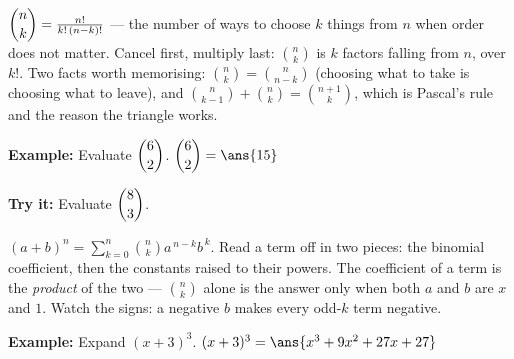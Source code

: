\documentclass[12pt]{article}
\begin{document}


\begin{formulabox}
$\dbinom{n}{k} = \frac{n!}{k!\,(n-k)!}$ --- the number of ways to choose $k$
things from $n$ when order does not matter. Cancel first, multiply last:
$\binom{n}{k}$ is $k$ factors falling from $n$, over $k!$. Two facts worth
memorising: $\binom{n}{k} = \binom{n}{n-k}$ (choosing what to take is choosing
what to leave), and $\binom{n}{k-1} + \binom{n}{k} = \binom{n+1}{k}$, which is
Pascal's rule and the reason the triangle works.
\end{formulabox}

\begin{examplebox}
\textbf{Example:} Evaluate $\dbinom{6}{2}$.
$\dbinom{6}{2} = \ans{15}$
\end{examplebox}

\begin{tryitbox}
\textbf{Try it:} Evaluate $\dbinom{8}{3}$.\\[2pt]
\end{tryitbox}


\begin{formulabox}
$(a+b)^n = \sum_{k=0}^{n} \binom{n}{k} a^{\,n-k} b^{\,k}$. Read a term off in two
pieces: the binomial coefficient, then the constants raised to their powers. The
coefficient of a term is the \emph{product} of the two --- $\binom{n}{k}$ alone
is the answer only when both $a$ and $b$ are $x$ and $1$. Watch the signs: a
negative $b$ makes every odd-$k$ term negative.
\end{formulabox}

\begin{examplebox}
\textbf{Example:} Expand $(x + 3)^3$.
$(x+3)^3 = \ans{x^3 + 9x^2 + 27x + 27}$
\end{examplebox}
\end{document}
